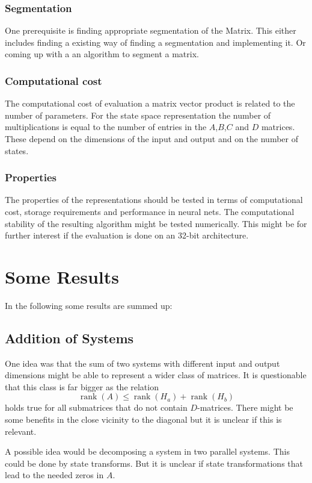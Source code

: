 \documentclass[lang=ngerman,inputenc=utf8,fontsize=10pt]{ldvarticle}
\DeclareMathOperator{\rank}{rank}
\begin{document}
\subsubsection*{Segmentation}
One prerequisite is finding appropriate segmentation of the Matrix. This either includes finding a existing way of finding a segmentation and implementing it.
Or coming up with a an algorithm to segment a matrix.

\subsubsection*{Computational cost}
The computational cost of evaluation a matrix vector product is related to the number of parameters.
For the state space representation the number of multiplications is equal to the number of entries in the $A$,$B$,$C$ and $D$ matrices. These depend on the dimensions of the input and output and on the number of states.

\subsubsection*{Properties}
The properties of the representations should be tested in terms of computational cost, storage requirements and performance in neural nets.
The computational stability of the resulting algorithm might be tested numerically. This might be for further interest if the evaluation is done on an 32-bit architecture.

\section*{Some Results}
In the following some results are summed up:

\subsection*{Addition of Systems}
One idea was that the sum of two systems with different input and output dimensions might be able to represent a wider class of matrices.
It is questionable that this class is far bigger as the relation 
\begin{equation}
	\rank(A) \leq \rank(H_a) + \rank(H_b) 
\end{equation}
holds true for all submatrices that do not contain $D$-matrices.
There might be some benefits in the close vicinity to the diagonal but it is unclear if this is relevant.

A possible idea would be decomposing a system in two parallel systems.
This could be done by state transforms. But it is unclear if state transformations that lead to the needed zeros in $A$.
\end{document}

